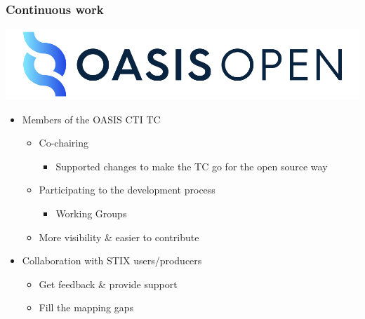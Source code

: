 \begin{frame}
    \frametitle{Continuous work}
    \begin{center}
        \includegraphics[scale=0.2]{images/oasis.png}
    \end{center}
    \begin{itemize}
        \item Members of the OASIS CTI TC
        \begin{itemize}
            \item Co-chairing
            \begin{itemize}
                \item Supported changes to make the TC go for the open source way
            \end{itemize}
            \item Participating to the development process
            \begin{itemize}
                \item Working Groups
            \end{itemize}
            \item More visibility \& easier to contribute
        \end{itemize}
        \item Collaboration with STIX users/producers
        \begin{itemize}
            \item Get feedback \& provide support
            \item Fill the mapping gaps
        \end{itemize}
    \end{itemize}
\end{frame}

